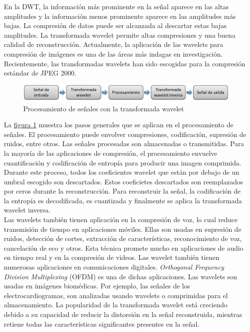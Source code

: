 \documentclass[11pt,lettersize]{article} %
\newcommand{\figura}[1]{\hyperref[{#1}]{figura \ref*{#1}}}
\begin{document}
En la DWT, la información más prominente en la señal aparece en las altas amplitudes y la información menos prominente aparece en las amplitudes más bajas. La compresión de datos puede ser alcanzada al descartar estas bajas amplitudes. La transformada wavelet permite altas compresiones y una buena calidad de reconstrucción. Actualmente, la aplicación de las wavelets para compresión de imágenes es una de las áreas más indagas en investigación. Recientemente, las transformadas wavelets han sido escogidas para la compresión estándar de JPEG 2000.
\begin{figure}[h!]
	\centering
	\includegraphics[width=.9\textwidth]{images/diagrama-wavelet.png}
	\caption{Procesamiento de señales con la transformada wavelet}
	\label{F-diagrama-wavele}
\end{figure}

La \figura{F-diagrama-wavele} muestra los pasos generales que se aplican en el procesamiento de señales. El procesamiento puede envolver compresiones, codificación, supresión de ruidos, entre otros. Las señales procesadas son almacenadas o transmitidas. Para la mayoría de las aplicaciones de compresión, el procesamiento envuelve cuantificación y codificación de entropía para producir una imagen comprimida. Durante este proceso, todos los coeficientes wavelet que están por debajo de un umbral escogido son descartados. Estos coeficietes descartados son reemplazados por ceros durante la reconstrucción. Para reconstruir la señal, la codificación de la entropía es decodificada, es cuantizada y finalmente se aplica la transformada wavelet inversa.\\

Las wavelets también tienen aplicación en la compresión de voz, lo cual reduce transmisión de tiempo en aplicaciones móviles. Ellas son usadas en supresión de ruidos, detección de cortes, extracción de características, reconocimiento de voz, cancelación de eco y otros. Esta técnica
promete mucho en aplicaciones de audio en tiempo real y en la compresión de videos. Las wavelet también tienen numerosas aplicaciones en comunicaciones digitales. \textit{Orthogonal Frequency Division Multiplexing} (OFDM) es una de dichas aplicaciones. Las wavelets son usadas en imágenes biomédicas. Por ejemplo, las señales de los electrocardiogramas, son analizadas usando wavelets o comprimidas para el almacenamiento. La popularidad de la transformada wavelet está creciendo debido a su capacidad de reducir la distorsión en la señal reconstruida, mientras retiene todas las características significantes presentes en la señal.
\end{document}
